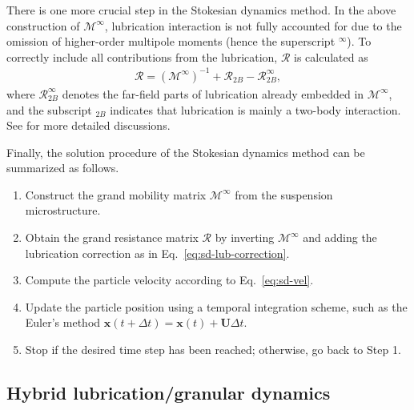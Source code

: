 There is one more crucial step in the Stokesian dynamics method.
In the above construction of $\mathscr{M}^\infty$, lubrication interaction is not fully accounted for due to the omission of higher-order multipole moments (hence the superscript $^\infty$). To correctly include all contributions from the lubrication, $\mathscr{R}$ is calculated as
\begin{equation} \label{eq:sd-lub-correction}
 \begin{aligned}
  \mathscr{R} = (\mathscr{M}^\infty)^{-1} +\mathscr{R}_{2B} - \mathscr{R}_{2B}^\infty,
 \end{aligned}
\end{equation}
where $\mathscr{R}_{2B}^\infty$ denotes the far-field parts of lubrication already embedded in $\mathscr{M}^\infty$, and the subscript $_{2B}$ indicates that lubrication is mainly a two-body interaction. See \cite{durlofsky_brady_bossis_1987, Brady_Bossis1988} for more detailed discussions.  

Finally, the solution procedure of the Stokesian dynamics method can be summarized as follows.
\begin{enumerate}
\item Construct the grand mobility matrix $\mathscr{M}^\infty$ from the suspension microstructure.
\item Obtain the grand resistance matrix $\mathscr{R}$ by inverting $\mathscr{M}^\infty$ and adding the lubrication correction as in Eq.\ \eqref{eq:sd-lub-correction}.
\item Compute the particle velocity according to Eq.\ \eqref{eq:sd-vel}.
\item Update the particle position using a temporal integration scheme, such as the Euler's method $\bm{x}(t+\Delta t)= \bm{x}(t) +\bm{U} \Delta t$.
\item Stop if the desired time step has been reached; otherwise, go back to Step 1.
\end{enumerate}


\subsection{Hybrid lubrication/granular dynamics}

